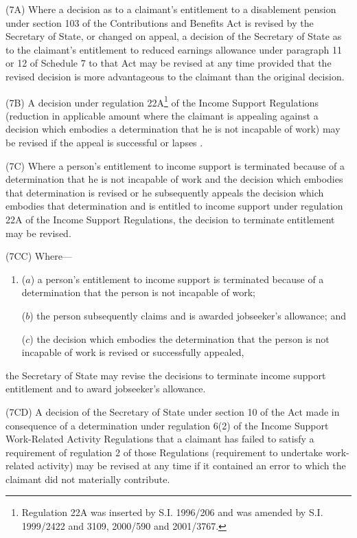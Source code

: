 \documentclass[12pt,a4paper]{article}
\begin{document}
(7A) Where a decision as to a claimant’s entitlement to a disablement pension under section 103 of the Contributions and Benefits Act is revised by the Secretary of State, or changed on appeal, a decision of the Secretary of State as to the claimant’s entitlement to reduced earnings allowance under paragraph 11 or 12 of Schedule 7 to that Act may be revised at any time provided that the revised decision is more advantageous to the claimant than the original decision.

(7B) A decision under regulation 22A\footnote{Regulation 22A was inserted by S.I. 1996/206 and was amended by S.I. 1999/2422 and 3109, 2000/590 and 2001/3767.} of the Income Support Regulations (reduction in applicable amount where the claimant is appealing against a decision which embodies a determination that he is not incapable of work) may be revised if the appeal is successful
or lapses%
.

(7C) Where a person’s entitlement to income support is terminated because of a determination that he is not incapable of work and 
the decision which embodies that determination is revised or  %
he subsequently appeals the decision 
which embodies  %
that determination and is entitled to income support under regulation 22A of the Income Support Regulations, the decision to terminate entitlement may be revised.

(7CC)  Where—
\begin{enumerate}\item[]
($a$) a person’s entitlement to income support is terminated because of a determination that the person is not incapable of work;

($b$) the person subsequently claims and is awarded jobseeker’s allowance; and

($c$) the decision which embodies the determination that the person is not incapable of work is revised or successfully appealed,
\end{enumerate}
the Secretary of State may revise the decisions to terminate income support entitlement and to award jobseeker’s allowance.

(7CD) A decision of the Secretary of State under section 10 of the Act made in consequence of a determination under regulation 6(2) of the Income Support Work-Related Activity Regulations that a claimant has failed to satisfy a requirement of regulation 2 of those Regulations (requirement to undertake work-related activity) may be revised at any time if it contained an error to which the claimant did not materially contribute.
\end{document}
